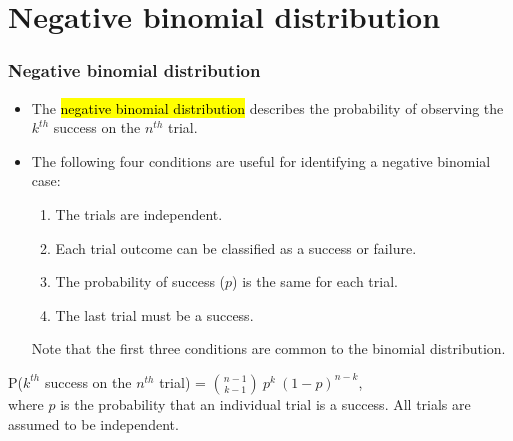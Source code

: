 
\section{Negative binomial distribution}


\begin{frame}
\frametitle{Negative binomial distribution}

\begin{itemize}

\item The \hl{negative binomial distribution} describes the probability of observing the $k^{th}$ success on the $n^{th}$ trial.

\item The following four conditions are useful for identifying a negative binomial case:
\begin{enumerate}
\item The trials are independent.
\item Each trial outcome can be classified as a success or failure.
\item The probability of success ($p$) is the same for each trial.
\item The last trial must be a success.
\end{enumerate}
Note that the first three conditions are common to the binomial distribution.

\end{itemize}

\vfill

{
P($k^{th}$ success on the $n^{th}$ trial) = ${n-1 \choose k-1}~p^k~(1-p)^{n-k}$, \\
where $p$ is the probability that an individual trial is a success. All trials are assumed to be independent.
}

\end{frame}


